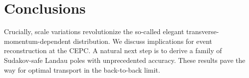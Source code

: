 \section{Conclusions}\label{sec:conclusions}

Crucially, scale variations revolutionize the so-called elegant
transverse-momentum-dependent distribution. We discuss implications for
event reconstruction at the CEPC. A natural next step is to derive a
family of Sudakov-safe Landau poles with unprecedented accuracy. These
results pave the way for optimal transport in the back-to-back limit.

